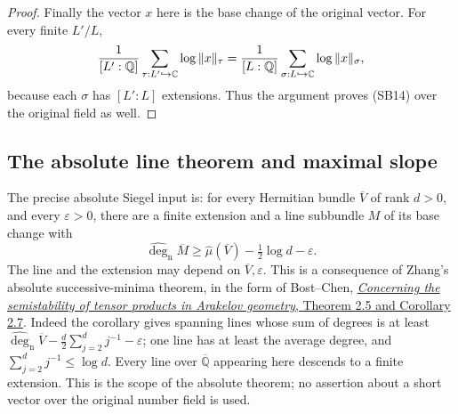 \begin{proof}
Finally the vector \(x\) here is the base
change of the original vector.
For every finite \(L'/L\),
\[
 {1\over[L':\mathbb Q]}
     \sum_{\tau:L'\hookrightarrow\mathbb C}
            \log\|x\|_\tau
       ={1\over[L:\mathbb Q]}
     \sum_{\sigma:L\hookrightarrow\mathbb C}
            \log\|x\|_\sigma,
\]
because each \(\sigma\) has \([L':L]\)
extensions.
Thus the argument proves (SB14) over the
original field as well.
\end{proof}

\subsection{The absolute line theorem and maximal slope}

The precise absolute Siegel input is:
for every Hermitian bundle \(\overline V\)
of rank \(d>0\), and every \(\varepsilon>0\),
there are a finite extension and a line
subbundle \(M\) of its base change with
\[
 \widehat{\deg}_{\mathrm n}\overline M
       \ge\widehat\mu(\overline V)
                              -\tfrac12\log d-\varepsilon. \tag{SB18}
\]
The line and the extension may depend on
\(\overline V,\varepsilon\).
This is a consequence of Zhang's absolute
successive-minima theorem, in the form of
Bost--Chen,
\href{https://webusers.imj-prg.fr/~huayi.chen/Recherche/bost_chen.pdf}
{\emph{Concerning the semistability of
tensor products in Arakelov geometry},
Theorem 2.5 and Corollary 2.7}.
Indeed the corollary gives spanning lines
whose sum of degrees is at least
\(\widehat{\deg}_{\mathrm n}\overline V
-\tfrac d2\sum_{j=2}^d j^{-1}-\varepsilon\);
one line has at least the average degree,
and \(\sum_{j=2}^d j^{-1}\le\log d\).
Every line over \(\overline{\mathbb Q}\)
appearing here descends to a finite
extension. This is the scope of the
absolute theorem; no assertion about a
short vector over the original number
field is used.

